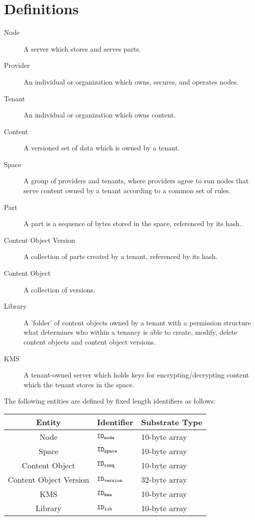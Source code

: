 \section{Definitions}
\begin{description}
  \item[Node] A server which stores and serves parts.
  \item[Provider] An individual or organization which owns, secures, and operates nodes.
  \item[Tenant] An individual or organization which owns content.
  \item[Content] A versioned set of data which is owned by a tenant.
  \item[Space] A group of providers and tenants, where providers agree to run nodes that serve content owned by a tenant according to a common set of rules.
  \item[Part] A part is a sequence of bytes stored in the space, referenced by its hash. 
  \item[Content Object Version] A collection of parts created by a tenant, referenced by its hash.
  \item[Content Object] A collection of versions.
  \item[Library] A 'folder' of content objects owned by a tenant with a permission structure what determines who within a tenancy is able to create, modify, delete content objects and content object versions.
  \item[KMS] A tenant-owned server which holds keys for encrypting/decrypting content which the tenant stores in the space.
\end{description}

The following entities are defined by fixed length identifiers as follows:
\begin{center}
  \begin{tabular}{| c | l | l |}
    \hline
    Entity & Identifier & Substrate Type \\
    \hline 
    Node & $\mathtt{ID_{node}}$ & 10-byte array \\
    Space & $\mathtt{ID_{space}}$ & 10-byte array \\
    Content Object & $\mathtt{ID_{conq}}$ & 10-byte array \\
    Content Object Version & $\mathtt{ID_{version}}$ & 32-byte array \\
    KMS & $\mathtt{ID_{kms}}$ & 10-byte array \\
    Library & $\mathtt{ID_{lib}}$ & 10-byte array \\
    \hline 
  \end{tabular}
\end{center}
